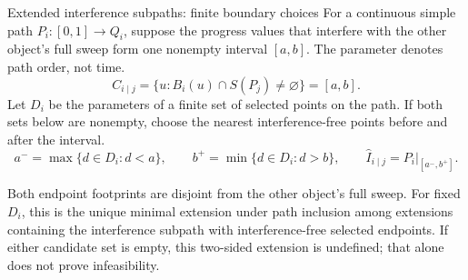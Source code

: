 \begin{frame}{Extended interference subpaths: finite boundary choices}
\small
For a continuous simple path $P_i:[0,1]\to Q_i$, suppose the progress values that
interfere with the other object's full sweep form one nonempty interval $[a,b]$.
The parameter denotes path order, not time.
\begin{equation}
 C_{i\mid j}=\{u:B_i(u)\cap S(P_j)\ne\varnothing\}=[a,b].\tag{24}
\end{equation}
Let $D_i$ be the parameters of a finite set of selected points on the path. If both
sets below are nonempty, choose the nearest interference-free points before and after the interval.
\begin{equation}
 a^- =\max\{d\in D_i:d<a\},\qquad
 b^+ =\min\{d\in D_i:d>b\},\qquad
 \widehat I_{i\mid j}=P_i|_{[a^-,b^+]}.\tag{25}
\end{equation}
\begin{center}\end{center}
\footnotesize Both endpoint footprints are disjoint from the other object's full sweep.
For fixed $D_i$, this is the unique minimal extension under path inclusion among
extensions containing the interference subpath with interference-free selected endpoints.
If either candidate set is empty, this two-sided extension is undefined; that alone does not prove infeasibility.
\end{frame}

